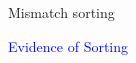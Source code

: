 \documentclass[notes,10pt, aspectratio=169]{beamer}
\newenvironment{wideitemize}{\itemize\addtolength{\itemsep}{10pt}}{\enditemize}
\begin{document}
\begin{frame}{Mismatch sorting}
\begin{wideitemize}
\begin{enumerate}
            \end{enumerate}
    
        \end{wideitemize}
    

\end{frame}


        





        \begin{frame}[noframenumbering]

            \huge \centering \textcolor{blue}{Evidence of Sorting}
        \end{frame}
\end{document}
